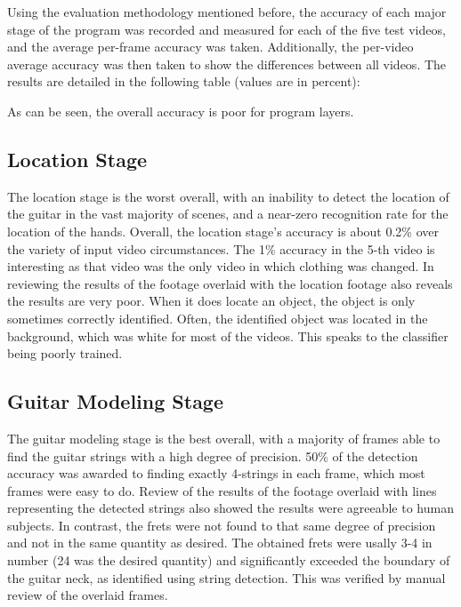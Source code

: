 Using the evaluation methodology mentioned before, the accuracy of each major stage of the program was
recorded and measured for each of the five test videos, and the average per-frame accuracy was taken.
Additionally, the per-video average accuracy was then taken to show the differences between all videos.
The results are detailed in the following table (values are in percent):
\vspace{5mm}

\begin{centering}

\end{centering}
\vspace{5mm}

As can be seen, the overall accuracy is poor for program layers.
\subsection{Location Stage}
The location stage is the worst overall, with an inability to detect the location of the guitar
in the vast majority of scenes, and a near-zero recognition rate for the location of the hands.
Overall, the location stage's accuracy is about 0.2\% over the variety of input video circumstances.
The 1\% accuracy in the 5-th video is interesting as that video was the only video in which clothing was changed.
In reviewing the results of the footage overlaid with the location footage also reveals the results
are very poor. When it does locate an object, the object is only sometimes correctly identified.
Often, the identified object was located in the background, which was white for most of the videos.
This speaks to the classifier being poorly trained.

\subsection{Guitar Modeling Stage}
The guitar modeling stage is the best overall, with a majority of frames able to find the guitar strings
with a high degree of precision. 50\% of the detection accuracy was awarded to finding exactly 4-strings
in each frame, which most frames were easy to do. Review of the results of the footage overlaid with lines
representing the detected strings also showed the results were agreeable to human subjects.
In contrast, the frets were not found to that same degree of precision and not in the same quantity as desired.
The obtained frets were usally 3-4 in number (24 was the desired quantity) and significantly exceeded the boundary
of the guitar neck, as identified using string detection. This was verified by manual review of the overlaid
frames.

